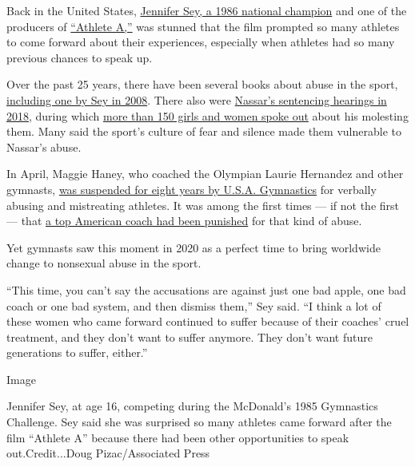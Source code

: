 Back in the United States,
\href{https://www.nytimes.com/2017/03/30/opinion/sunday/how-gymnastics-culture-breeds-sexual-abuse.html}{Jennifer
Sey, a 1986 national champion} and one of the producers of
\href{https://www.rogerebert.com/reviews/athlete-a-movie-review-2020}{``Athlete
A,''} was stunned that the film prompted so many athletes to come
forward about their experiences, especially when athletes had so many
previous chances to speak up.

Over the past 25 years, there have been several books about abuse in the
sport,
\href{https://www.npr.org/templates/story/story.php?storyId=90105904}{including
one by Sey in 2008}. There also were
\href{https://www.nytimes.com/video/sports/100000005686677/gymnasts-confront-larry-nassar-over-sexual-abuse.html?searchResultPosition=8}{Nassar's
sentencing hearings in 2018}, during which
\href{https://www.nytimes.com/2018/01/24/sports/rachael-denhollander-nassar-gymnastics.html?searchResultPosition=28}{more
than 150 girls and women spoke out} about his molesting them. Many said
the sport's culture of fear and silence made them vulnerable to Nassar's
abuse.

In April, Maggie Haney, who coached the Olympian Laurie Hernandez and
other gymnasts,
\href{https://www.nytimes.com/2020/05/01/sports/maggie-haney-gymnastics-abuse.html}{was
suspended for eight years by U.S.A. Gymnastics} for verbally abusing and
mistreating athletes. It was among the first times --- if not the first
--- that
\href{https://www.nytimes.com/2020/04/29/sports/gymnastics-coach-banned-maggie-haney.html}{a
top American coach had been punished} for that kind of abuse.

Yet gymnasts saw this moment in 2020 as a perfect time to bring
worldwide change to nonsexual abuse in the sport.

``This time, you can't say the accusations are against just one bad
apple, one bad coach or one bad system, and then dismiss them,'' Sey
said. ``I think a lot of these women who came forward continued to
suffer because of their coaches' cruel treatment, and they don't want to
suffer anymore. They don't want future generations to suffer, either.''

Image

Jennifer Sey, at age 16, competing during the McDonald's 1985 Gymnastics
Challenge. Sey said she was surprised so many athletes came forward
after the film ``Athlete A'' because there had been other opportunities
to speak out.Credit...Doug Pizac/Associated Press

